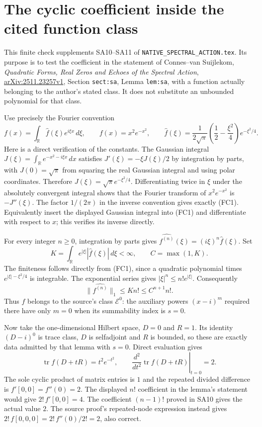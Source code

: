 \documentclass[11pt]{article}
\begin{document}
\endgroup

\clearpage\begingroup
\part*{The cyclic coefficient inside the cited function class}



This finite check supplements SA10--SA11 of
\texttt{NATIVE\_SPECTRAL\_ACTION.tex}. Its purpose is to test
the coefficient in the statement of Connes--van Suijlekom,
\emph{Quadratic Forms, Real Zeros and Echoes of the Spectral Action},
\href{https://arxiv.org/abs/2511.23257v1}{arXiv:2511.23257v1},
Section \texttt{sect:sa}, Lemma \texttt{lem:sa}, with a
function actually belonging to the author's stated class.
It does not substitute an unbounded polynomial for that class.

Use precisely the Fourier convention
\[
f(x)=\int_{\mathbb R}\widehat f(\xi)e^{i\xi x}\,d\xi,
\qquad
f(x)=x^2e^{-x^2},\qquad
\widehat f(\xi)=\frac1{2\sqrt\pi}
\left(\frac12-\frac{\xi^2}{4}\right)e^{-\xi^2/4}.
\tag{FC1}
\]
Here is a direct verification of the constants.
The Gaussian integral
$J(\xi)=\int_{\mathbb R}e^{-x^2-i\xi x}\,dx$ satisfies
$J'(\xi)=-\xi J(\xi)/2$ by integration by parts, with
$J(0)=\sqrt\pi$ from squaring the real Gaussian integral
and using polar coordinates. Therefore
$J(\xi)=\sqrt\pi e^{-\xi^2/4}$.
Differentiating twice in $\xi$ under the absolutely
convergent integral shows that the Fourier transform
of $x^2e^{-x^2}$ is $-J''(\xi)$.
The factor $1/(2\pi)$ in the inverse convention gives
exactly (FC1). Equivalently insert the displayed
Gaussian integral into (FC1) and differentiate with
respect to $x$; this verifies its inverse directly.

For every integer $n\geq0$, integration by parts gives
$\widehat{f^{(n)}}(\xi)=(i\xi)^n\widehat f(\xi)$.
Set
\[
K=\int_{\mathbb R}e^{|\xi|}|\widehat f(\xi)|\,d\xi<\infty,
\qquad C=\max(1,K).
\tag{FC2}
\]
The finiteness follows directly from (FC1), since a
quadratic polynomial times $e^{|\xi|-\xi^2/4}$ is
integrable. The exponential series gives
$|\xi|^n\leq n!e^{|\xi|}$. Consequently
\[
\|\widehat{f^{(n)}}\|_1
\leq K n!\leq C^{n+1}n!.
\tag{FC3}
\]
Thus $f$ belongs to the source's class $\mathcal E^0$:
the auxiliary powers $(x-i)^m$ required there have
only $m=0$ when its summability index is $s=0$.

Now take the one-dimensional Hilbert space, $D=0$ and
$R=1$. Its identity $(D-i)^0$ is trace class, $D$ is
selfadjoint and $R$ is bounded, so these are exactly
data admitted by that lemma with $s=0$. Direct evaluation
gives
\[
\operatorname{tr}f(D+tR)=t^2e^{-t^2},\qquad
\left.\frac{d^2}{dt^2}\operatorname{tr}f(D+tR)\right|_{t=0}
=2.
\tag{FC4}
\]
The sole cyclic product of matrix entries is $1$ and
the repeated divided difference is
$f'[0,0]=f''(0)=2$.
The displayed $n!$ coefficient in the lemma's statement
would give $2!\,f'[0,0]=4$. The coefficient
$(n-1)!$ proved in SA10 gives the actual value $2$.
The source proof's repeated-node expression instead
gives $2!\,f[0,0,0]=2!\,f''(0)/2!=2$, also correct.
\end{document}
